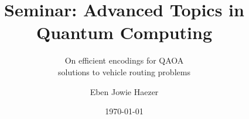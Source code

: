 \documentclass {beamer}
\title	{
	Seminar: Advanced Topics in \\
	Quantum Computing \\
}
\subtitle {
	On efficient encodings for QAOA \\
	solutions to vehicle routing problems
}
\author {Eben Jowie Haezer}
\date {\today}
\begin{document}
\maketitle

\begin {frame}

\end {frame}
\end{document}
